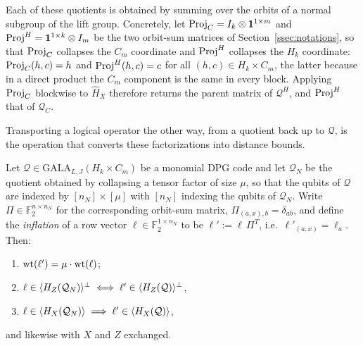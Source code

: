 Each of these quotients is obtained by summing over the orbits of a normal subgroup of the lift group. Concretely, let $\mathrm{Proj}_{C} = I_{k}\otimes \mathbf{1}^{1\times m}$ and $\mathrm{Proj}^{H} = \mathbf{1}^{1\times k}\otimes I_m$ be the two orbit-sum matrices of Section~\ref{ssec:notations}, so that $\mathrm{Proj}_C$ collapses the $C_m$ coordinate and $\mathrm{Proj}^H$ collapses the $H_k$ coordinate: $\mathrm{Proj}_C(h,c) = h$ and $\mathrm{Proj}^H(h,c) = c$ for all $(h,c)\in H_k\times C_m$, the latter because in a direct product the $C_m$ component is the same in every block. Applying $\mathrm{Proj}_C$ blockwise to $\hat H_X$ therefore returns the parent matrix of $\mathcal Q^H$, and $\mathrm{Proj}^H$ that of $\mathcal Q_C$.

Transporting a logical operator the other way, from a quotient back up to $\mathcal Q$, is the operation that converts these factorizations into distance bounds.

\begin{lemma}\label{lem:inflation}
Let $\mathcal{Q}\in \mathrm{GALA}_{L,J}(H_k\times C_m)$ be a monomial DPG code and let $\mathcal Q_N$ be the quotient obtained by collapsing a tensor factor of size $\mu$, so that the qubits of $\mathcal Q$ are indexed by $[n_N]\times[\mu]$ with $[n_N]$ indexing the qubits of $\mathcal Q_N$. Write $\Pi\in\mathbb F_2^{n\times n_N}$ for the corresponding orbit-sum matrix, $\Pi_{(a,x),b} = \delta_{ab}$, and define the \emph{inflation} of a row vector $\ell\in\mathbb F_2^{1\times n_N}$ to be $\ell' := \ell\,\Pi^T$, i.e.\ $\ell'_{(a,x)} = \ell_a$. Then:
\begin{enumerate}
    \item $\mathrm{wt}(\ell') = \mu\cdot\mathrm{wt}(\ell)$;
    \item $\ell\in\langle H_Z(\mathcal Q_N) \rangle^\perp \iff \ell'\in\langle H_Z(\mathcal Q) \rangle^\perp$,
    \item $\ell\in\langle H_X(\mathcal Q_N) \rangle \implies \ell'\in\langle H_X(\mathcal Q) \rangle$, 
\end{enumerate}
and likewise with $X$ and $Z$ exchanged. 
\end{lemma}


